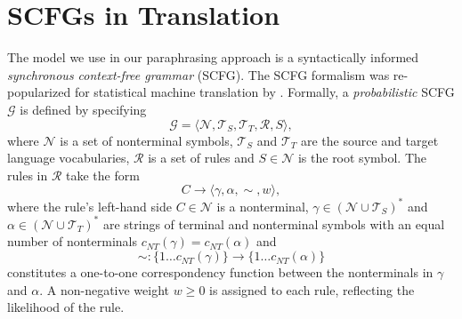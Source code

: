 \documentclass[11pt]{article}
\newcommand{\mnote}[1]{\marginpar{%
  \vskip-\baselineskip
  \raggedright\footnotesize
  \itshape\hrule\smallskip\footnotesize{#1}\par\smallskip\hrule}}
\begin{document}


\section{SCFGs in Translation} \label{formalism}

The model we use in our paraphrasing approach is a syntactically
informed \emph{ synchronous context-free grammar} (SCFG).  The SCFG
formalism \cite{Aho1972} was re-popularized for statistical machine
translation by .  Formally, a \emph{probabilistic}
SCFG $\mathcal{G}$ is defined by specifying
\[
\mathcal{G} = \langle \mathcal{N}, \mathcal{T}_S, \mathcal{T}_T,
\mathcal{R}, S \rangle ,
\]
where $\mathcal{N}$ is a set of nonterminal symbols, $\mathcal{T}_S$
and $\mathcal{T}_T$ are the source and target language vocabularies,
$\mathcal{R}$ is a set of rules and $S \in \mathcal{N}$ is the root
symbol. The rules in $\mathcal{R}$ take the form
\begin{equation*}
  C \rightarrow \langle \gamma, \alpha, \sim, w \rangle ,
\end{equation*}
where the rule's left-hand side $C \in \mathcal{N}$ is a nonterminal,
$\gamma \in (\mathcal{N} \cup \mathcal{T}_S)^*$ and $\alpha \in
(\mathcal{N} \cup \mathcal{T}_T)^*$ are strings of terminal and
nonterminal symbols with an equal number of nonterminals
$c_{\mathit{NT}}(\gamma) = c_{\mathit{NT}}(\alpha)$ and 
$$
\sim : \{1 \ldots c_{\mathit{NT}}(\gamma)\} \rightarrow \{1 \ldots
c_{\mathit{NT}}(\alpha)\}
$$ 
constitutes a one-to-one correspondency function between the
nonterminals in $\gamma$ and $\alpha$. A non-negative weight $w \geq
0$ is assigned to each rule, reflecting the likelihood of the rule.
\end{document}
